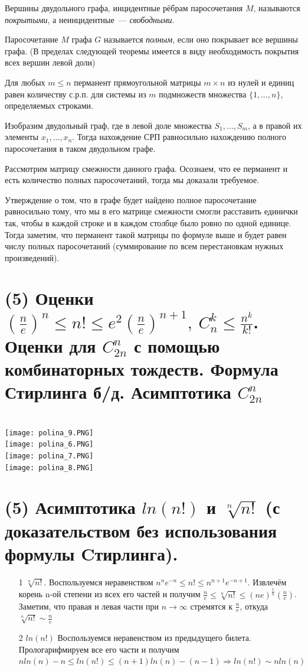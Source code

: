 \Def Вершины двудольного графа, инцидентные рёбрам паросочетания $M$, называются \textit{покрытыми}, а неинцидентные~--- \textit{свободными}.

\Def Паросочетание $M$ графа $G$ называется \textit{полным}, если оно покрывает все вершины графа. (В пределах следующей теоремы имеется в виду необходимость покрытия всех вершин левой доли)

\Th Для любых $m \leq n$ перманент прямоугольной матрицы $m \times n$ из нулей и единиц равен количеству с.р.п. для системы из $m$ подмножеств множества $\{1, \ldots, n\}$, определяемых строками.

\Proof Изобразим двудольный граф, где в левой доле множества $S_1, \ldots, S_m$, а в правой их элементы $x_1, \ldots, x_n$. Тогда нахождение СРП равносильно нахождению полного паросочетания в таком двудольном графе. 

Рассмотрим матрицу смежности данного графа. Осознаем, что ее перманент и есть количество полных паросочетаний, тогда мы доказали требуемое.

Утверждение о том, что в графе будет найдено полное паросочетание равносильно тому, что мы в его матрице смежности смогли расставить единички так, чтобы в каждой строке и в каждом столбце было ровно по одной единице. Тогда заметим, что перманент такой матрицы по формуле выше и будет равен числу полных паросочетаний (суммирование по всем перестановкам нужных произведений).

\EndProof
\newpage{}

\section{(5) Оценки $(\frac{n}{e})^n \leqslant n! \leqslant e^2(\frac{n}{e})^{n+1}, \ C_n^k \leqslant \frac{n^k}{k!}$. Оценки для $C_{2n}^n$ с помощью комбинаторных тождеств. Формула Стирлинга б/д. Асимптотика $C_{2n}^n$}
\
\\
\texttt{[image: polina\_9.PNG]}\\
\texttt{[image: polina\_6.PNG]}\\
\texttt{[image: polina\_7.PNG]}\\
\texttt{[image: polina\_8.PNG]}
\section{(5) Асимптотика $ln (n!)$ и $\sqrt[n]{n!}$ (с доказательством без использования формулы Cтирлинга).}
\begin{itemize}
    \item [1] $\sqrt[n]{n!}$. Воспользуемся неравенством $n^ne^{-n} \leqslant n! \leqslant n^{n+1}e^{-n+1}$. Извлечём
корень n-ой степени из всех его частей и получим $\frac{n}{e} \leqslant \sqrt[n]{n!} \leqslant (ne)^{\frac{1}{n}}(\frac{n}{e})$. Заметим, что правая и левая части при $n \rightarrow \infty$ стремятся к $\frac{n}{e}$, откуда $\sqrt[n]{n!} \sim \frac{n}{e}$
\item[2] $ln (n!)$  Воспользуемся неравенством из предыдущего билета. Прологарифмируем все его части и получим $nln(n) - n\leqslant ln(n!)\leqslant (n+1)ln(n) - (n-1) \Longrightarrow ln (n!) \sim nln(n)$
\end{itemize}
